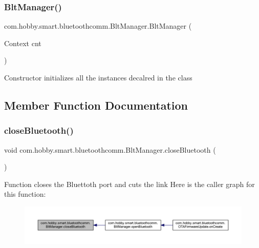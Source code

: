 \subsubsection{\texorpdfstring{Blt\+Manager()}{BltManager()}\hspace{0.1cm}{\footnotesize\ttfamily [2/2]}}
{\footnotesize\ttfamily com.\+hobby.\+smart.\+bluetoothcomm.\+Blt\+Manager.\+Blt\+Manager (\begin{DoxyParamCaption}\item[{Context}]{cnt }\end{DoxyParamCaption})}

Constructor initializes all the instances decalred in the class 

\subsection{Member Function Documentation}
\mbox{\label{classcom_1_1hobby_1_1smart_1_1bluetoothcomm_1_1_blt_manager_a0118f6e69c6ee2a9059eb71a178c4b7f}} 
\subsubsection{\texorpdfstring{close\+Bluetooth()}{closeBluetooth()}}
{\footnotesize\ttfamily void com.\+hobby.\+smart.\+bluetoothcomm.\+Blt\+Manager.\+close\+Bluetooth (\begin{DoxyParamCaption}{ }\end{DoxyParamCaption})}

Function closes the Bluettoth port and cuts the link Here is the caller graph for this function\+:\nopagebreak
\begin{figure}[H]
\begin{center}
\leavevmode
\includegraphics[width=350pt]{classcom_1_1hobby_1_1smart_1_1bluetoothcomm_1_1_blt_manager_a0118f6e69c6ee2a9059eb71a178c4b7f_icgraph}
\end{center}
\end{figure}
\mbox{\label{classcom_1_1hobby_1_1smart_1_1bluetoothcomm_1_1_blt_manager_ad44dd68329e449633f69f8d3904f35d7}} 
